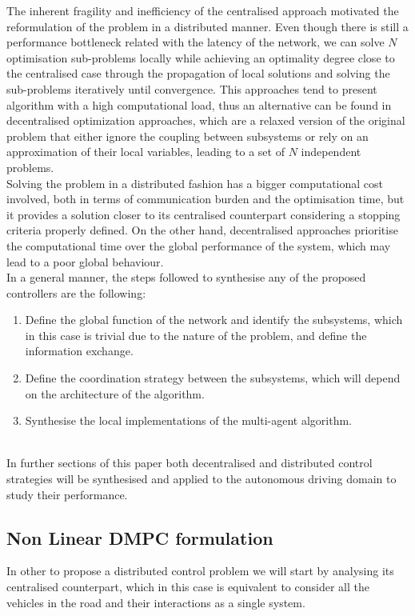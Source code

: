 \documentclass[a4paper,fleqn]{cas-sc}
\begin{document}
The inherent fragility and inefficiency of the centralised approach motivated the reformulation of the problem in a distributed manner. Even though there is still a performance bottleneck related with the latency of the network, we can solve $N$ optimisation sub-problems locally while achieving an optimality degree close to the centralised case through the propagation of local solutions and solving the sub-problems iteratively until convergence. This approaches tend to present algorithm with a high computational load, thus an alternative can be found in decentralised optimization approaches, which are a relaxed version of the original problem that either ignore the coupling between subsystems or rely on an approximation of their local variables, leading to a set of $N$ independent problems.\\ 

Solving the problem in a distributed fashion has a bigger computational cost involved, both in terms of communication burden and the optimisation time, but it provides a solution closer to its centralised counterpart considering a stopping criteria properly defined. On the other hand, decentralised approaches prioritise the computational time over the global performance of the system, which may lead to a poor global behaviour.\\ 

In a general manner, the steps followed to synthesise any of the proposed controllers are the following: 

\begin{enumerate}
  \item Define the global function of the network and identify the subsystems, which in this case is trivial due to the nature of the problem, and define the information exchange.
  \item Define the coordination strategy between the subsystems, which will depend on the architecture of the algorithm.
  \item Synthesise the local implementations of the multi-agent algorithm. 
\end{enumerate}\\ 

In further sections of this paper both decentralised and distributed control strategies will be synthesised and applied to the autonomous driving domain to study their performance. 

\subsection {Non Linear DMPC formulation }
\label{NL MPC}
In other to propose a distributed control problem we will start by analysing its centralised counterpart, which in this case is equivalent to consider all the vehicles in the road and their interactions as a single system. 
\end{document}
